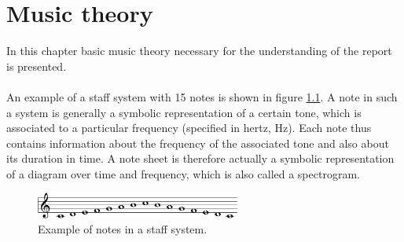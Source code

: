 \chapter{Music theory}
In this chapter basic music theory necessary for the understanding of the report is presented.
\\ \\
An example of a staff system with 15 notes is shown in figure \ref{fig:cmajor}. A note in such a system is generally a symbolic representation of a certain tone, which is associated to a particular frequency (specified in hertz, Hz). Each note thus contains information about the frequency of the associated tone and also about its duration in time. A note sheet is therefore actually a symbolic representation of a diagram over time and frequency, which is also called a spectrogram.

\begin{figure}[H]
    \centering
    \includegraphics[width = 0.6\textwidth]{figures/Cmajor.png}
    \caption{Example of notes in a staff system.}
    \label{fig:cmajor}
\end{figure}

